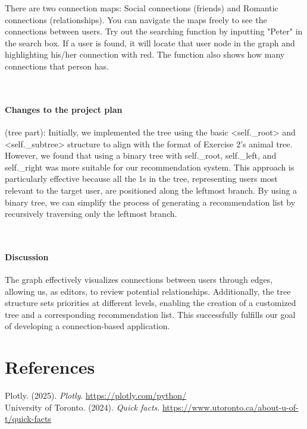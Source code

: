 \documentclass[fontsize=11pt]{article}
\begin{document}
There are two connection maps: Social connections (friends) and Romantic connections (relationships). You can navigate the maps freely to see the connections between users. Try out the searching function by inputting "Peter" in the search box. If a user is found, it will locate that user node in the graph and highlighting his/her connection with red. The function also shows how many connections that person has.


\\
\paragraph{Changes to the project plan}
(tree part): Initially, we implemented the tree using the basic <self.\_root> and <self.\_subtree> structure to align with the format of Exercise 2's animal tree. However, we found that using a binary tree with self.\_root, self.\_left, and self.\_right was more suitable for our recommendation system. This approach is particularly effective because all the 1s in the tree, representing users most relevant to the target user, are positioned along the leftmost branch. By using a binary tree, we can simplify the process of generating a recommendation list by recursively traversing only the leftmost branch.


\\
\paragraph{Discussion}
The graph effectively visualizes connections between users through edges, allowing us, as editors, to review potential relationships. Additionally, the tree structure sets priorities at different levels, enabling the creation of a customized tree and a corresponding recommendation list. This successfully fulfills our goal of developing a connection-based application.

\section*{References}

Plotly. (2025). \textit{Plotly}.
\url{https://plotly.com/python/}
\\
University of Toronto. (2024). \textit{Quick facts}.
\url{https://www.utoronto.ca/about-u-of-t/quick-facts}


\end{document}
